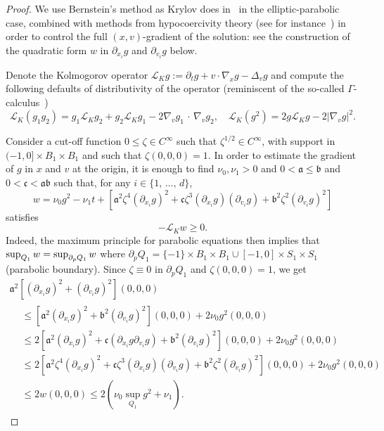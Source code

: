 \documentclass[10pt]{amsart}
\theoremstyle{definition}\newtheorem{defi}[theo]{Definition}\newtheorem{rema}[theo]{Remark}\newtheorem{exam}[theo]{Example}\newtheorem{exem}[theo]{Example}\newtheorem{nota}[theo]{Notation}
\newcommand{\cL}{\mathcal{L}}
\newcommand{\frka}{\mathfrak{a}}
\newcommand{\frkb}{\mathfrak{b}}
\newcommand{\frkc}{\mathfrak{c}}
\begin{document}
\begin{proof}
We use Bernstein's method as Krylov does in~\cite{krylov1996} in the elliptic-parabolic case, combined with methods from hypocoercivity theory (see for instance~\cite{villani2009memoir}) in order to control the full $(x,v)$-gradient of the solution: see the construction of the quadratic form $w$ in $\partial_{x_i} g$ and $\partial_{v_i} g$ below.

Denote the Kolmogorov operator $\cL_K g := \partial_t g + v \cdot \nabla_x g - \Delta_v g$ and compute the following defaults of distributivity of the operator (reminiscent of the so-called $\Gamma$-calculus~\cite{MR889476})
\begin{equation}\label{eq:square}
\cL_K(g_1g_2) = g_1 \cL_K g_2 + g_2 \cL_K g_1 - 2 \nabla_v g_1\,\cdot\,\nabla_v g_2,\quad \cL_K (g^2) = 2 g \cL_K g - 2 \left| \nabla_v g \right|^2.
\end{equation}


Consider a cut-off function $0 \le \zeta \in C^\infty$ such that $\zeta^{1/2} \in C^\infty$, with support in $(-1,0] \times B_1 \times B_1$ and such that $\zeta(0,0,0)=1$. In order to estimate the gradient of $g$ in $x$ and $v$ at the origin, it is enough to find $\nu_0, \nu_1>0$ and $0 < \frka \le \frkb$ and $0 < \frkc < \frka \frkb$ such that, for any $i \in \{1,\,\dots,\,d\}$,
\[
w = \nu_0 g^2 - \nu_1 t + \left[\frka^2 \zeta^4 (\partial_{x_i}g)^2 + \frkc \zeta^3 (\partial_{x_i} g)(\partial_{v_i}g) + \frkb^2 \zeta^2 (\partial_{v_i}g)^2\right]
\]
satisfies
\[
- \cL_K w \ge 0.
\]
Indeed, the maximum principle for parabolic equations then implies that $\sup_{Q_1} w \linebreak= \sup_{\partial_p Q_1} w$ where $\partial_p Q_1 = \{-1\} \times B_1 \times B_1 \cup [-1,0] \times S_1 \times S_1$ (parabolic boundary). Since $\zeta \equiv 0$ in $\partial_p Q_1$ and $\zeta (0,0,0) =1$, we get
\begin{multline}\label{eq:cs}
\frka^2 \left[\left(\partial_{x_i}g\right)^2 + (\partial_{v_i}g)^2
\right](0,0,0)\\
\begin{aligned}
 &\le \left[\frka^2 (\partial_{x_i}g)^2 + \frkb^2 (\partial_{v_i}g)^2
\right](0,0,0)+ 2 \nu_0 g^2(0,0,0) \\
& \le 2 \left[\frka^2 (\partial_{x_i}g)^2 +
\frkc (\partial_{x_i} g \partial_{v_i}g) + \frkb^2 (\partial_{v_i}g)^2
\right](0,0,0) + 2 \nu_0 g^2(0,0,0) \\
&\le 2 \left[\frka^2 \zeta^4(\partial_{x_i}g)^2 + \frkc \zeta^3(\partial_{x_i} g)(\partial_{v_i}g) + \frkb^2 \zeta^2(\partial_{v_i}g)^2 \right](0,0,0) + 2 \nu_0 g^2(0,0,0) \\
& \le 2 w(0,0,0) \le 2 \left(\nu_0 \sup_{Q_1} g^2 + \nu_1\right).
\end{aligned}
\end{multline}


\end{proof}
\end{document}
